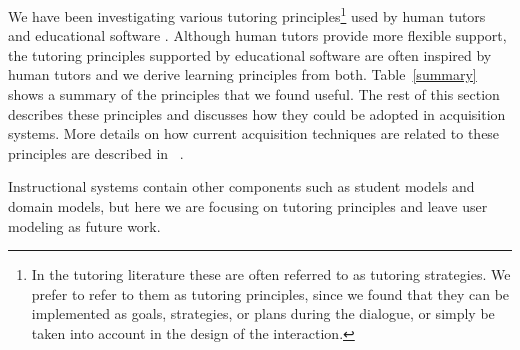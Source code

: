 \documentclass{llncs}
\begin{document}
We have been investigating various tutoring principles\footnote{In the
tutoring literature these are often referred to as tutoring strategies.
We prefer to refer to them as tutoring principles, since we found that they
can be implemented as goals, strategies, or plans during the dialogue, or
simply be taken into account in the design of the interaction.}  used
by human tutors and educational software \cite{Forbus01,Wenger87,Fox93}.
Although human tutors provide more flexible support, the tutoring principles
supported by educational software are often inspired by human tutors
\cite{Merrill92} and we derive learning principles from both.
Table~\ref{summary} shows a summary of the principles that we found useful.
The rest of this section describes these principles and discusses how they
could be adopted in acquisition systems.  More details on how current
acquisition techniques are related to these principles are described in
~\cite{gil-kim-cogsci02}.

Instructional systems contain other components such as student
models and domain models, but here we are focusing on tutoring principles and
leave user modeling as future work.  
\end{document}
